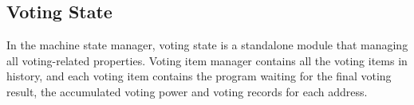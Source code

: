 \documentclass[main.tex]{subfiles}
\begin{document}
\subsection{Voting State}

In the machine state manager, voting state is a standalone module that managing all voting-related properties. Voting item manager contains all the voting items in history, and each voting item contains the program waiting for the final voting result, the accumulated voting power and voting records for each address.
\end{document}
